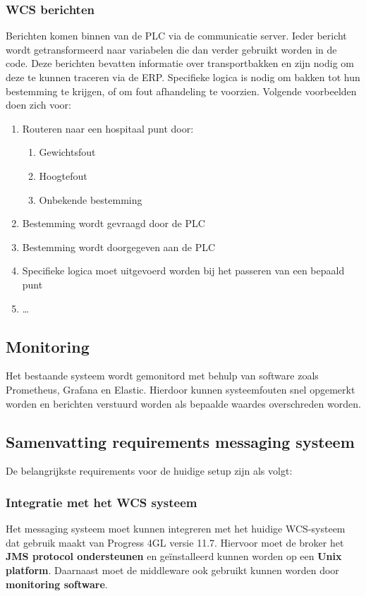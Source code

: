 \subsubsection{WCS berichten} 
Berichten komen binnen van de PLC via de communicatie server. Ieder bericht wordt getransformeerd naar variabelen die dan verder gebruikt worden in de code.
Deze berichten bevatten informatie over transportbakken en zijn nodig om deze te kunnen traceren via de ERP.
Specifieke logica is nodig om bakken tot hun bestemming te krijgen, of om fout afhandeling te voorzien.
Volgende voorbeelden doen zich voor:
\begin{enumerate}
\item Routeren naar een hospitaal punt door: 
\begin{enumerate}
  \item Gewichtsfout
  \item Hoogtefout
  \item Onbekende bestemming
\end{enumerate}
\item Bestemming wordt gevraagd door de PLC
\item Bestemming wordt doorgegeven aan de PLC 
\item Specifieke logica moet uitgevoerd worden bij het passeren van een bepaald punt
\item \dots
\end{enumerate}

\subsection{Monitoring}
Het bestaande systeem wordt gemonitord met behulp van software zoals Prometheus, Grafana en Elastic.
Hierdoor kunnen systeemfouten snel opgemerkt worden en berichten verstuurd worden als bepaalde waardes overschreden worden.

\subsection{Samenvatting requirements messaging systeem}
De belangrijkste requirements voor de huidige setup zijn als volgt:

\subsubsection{Integratie met het WCS systeem}
Het messaging systeem moet kunnen integreren met het huidige WCS-systeem dat gebruik maakt van Progress 4GL versie 11.7. 
Hiervoor moet de broker het \textbf{JMS protocol ondersteunen} en geïnstalleerd kunnen worden op een \textbf{Unix platform}.
Daarnaast moet de middleware ook gebruikt kunnen worden door \textbf{monitoring software}.

